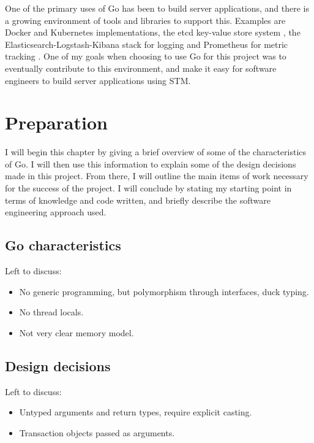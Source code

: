 \documentclass[12pt,a4paper,oneside,openright]{report}
\begin{document}
One of the primary uses of Go has been to build server applications,
and there is a growing environment of tools and libraries to support
this. Examples are Docker and Kubernetes implementations, the etcd
key-value store system \cite{etcd}, the Elasticsearch-Logstash-Kibana
stack for logging \cite{ELK} and Prometheus for metric tracking
\cite{Prom}. One of my goals when choosing to use Go for this project
was to eventually contribute to this environment, and make it easy for
software engineers to build server applications using STM.


\chapter{Preparation}

I will begin this chapter by giving a brief overview of some of the
characteristics of Go. I will then use this information to explain
some of the design decisions made in this project. From there, I will
outline the main items of work necessary for the success of the
project. I will conclude by stating my starting point in terms of
knowledge and code written, and briefly describe the software
engineering approach used.

\section{Go characteristics}
\label{sec:go-characteristics}

Left to discuss:

\begin{itemize}
\item No generic programming, but polymorphism through interfaces,
  duck typing.
\item No thread locals.
\item Not very clear memory model.
\end{itemize}

\section{Design decisions}
\label{sec:design-decisions}

Left to discuss:

\begin{itemize}
\item Untyped arguments and return types, require explicit casting.
\item Transaction objects passed as arguments.
\end{itemize}
\end{document}
